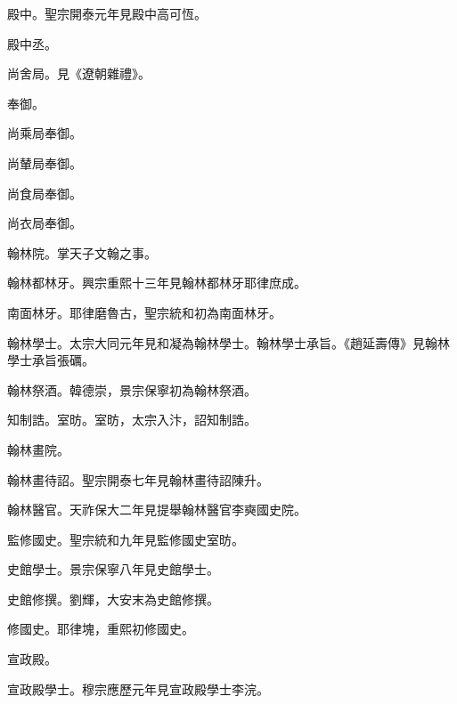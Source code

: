 \begin{pinyinscope}
 殿中。聖宗開泰元年見殿中高可恆。



 殿中丞。



 尚舍局。見《遼朝雜禮》。



 奉御。



 尚乘局奉御。



 尚輦局奉御。



 尚食局奉御。



 尚衣局奉御。



 翰林院。掌天子文翰之事。



 翰林都林牙。興宗重熙十三年見翰林都林牙耶律庶成。



 南面林牙。耶律磨魯古，聖宗統和初為南面林牙。



 翰林學士。太宗大同元年見和凝為翰林學士。翰林學士承旨。《趙延壽傳》見翰林學士承旨張礪。



 翰林祭酒。韓德崇，景宗保寧初為翰林祭酒。



 知制誥。室昉。室昉，太宗入汴，詔知制誥。



 翰林畫院。



 翰林畫待詔。聖宗開泰七年見翰林畫待詔陳升。



 翰林醫官。天祚保大二年見提舉翰林醫官李奭國史院。



 監修國史。聖宗統和九年見監修國史室昉。



 史館學士。景宗保寧八年見史館學士。



 史館修撰。劉輝，大安末為史館修撰。



 修國史。耶律塊，重熙初修國史。



 宣政殿。



 宣政殿學士。穆宗應歷元年見宣政殿學士李浣。




\end{pinyinscope}

